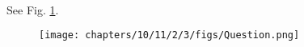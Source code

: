 \\
\solution See Fig. 
		\ref{fig:10/11/2/3}.
	\begin{figure}[H]
		\centering
 \texttt{[image: chapters/10/11/2/3/figs/Question.png]}
		\caption{}
		\label{fig:10/11/2/3}
  	\end{figure}
